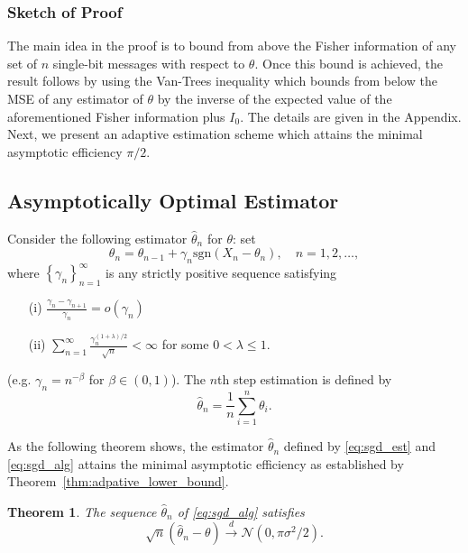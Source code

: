 \documentclass[letterpaper, conference]{IEEEtran}      %
\newtheorem{thm}{\bf{Theorem}}
\newcommand{\sgn}{\mathrm{sgn} }
\begin{document}
\subsubsection*{Sketch of Proof}
The main idea in the proof is to bound from above the Fisher information of any set of $n$ single-bit messages with respect to $\theta$. Once this bound is achieved, the result follows by using the Van-Trees inequality \cite{gill1995applications} which bounds from below the MSE of any estimator of $\theta$ by the inverse of the expected value of the aforementioned Fisher information plus $I_0$. The details are given in the Appendix.\\

Next, we present an adaptive estimation scheme which attains the minimal asymptotic efficiency $\pi/2$. 

\subsection{Asymptotically Optimal Estimator}
Consider the following estimator $\widehat{\theta}_n$ for $\theta$:  set 
\begin{equation}
\label{eq:sgd_alg}
\theta_n = \theta_{n-1} +  \gamma_n \sgn (X_n - \theta_n), \quad n = 1,2,\ldots,
\end{equation}
where $\left\{\gamma_n \right\}_{n=1}^\infty$ is any strictly positive sequence satisfying 
\begin{enumerate}
\item[(i)] $\frac{\gamma_n - \gamma_{n+1}}{\gamma_n} = o(\gamma_n)$ \\
\item[(ii)] $\sum_{n=1}^\infty \frac{\gamma_n^{(1+\lambda)/2}} {\sqrt{n}} < \infty$ 
for some $0< \lambda \leq 1$.
\end{enumerate}
(e.g. $\gamma_n = n^{-\beta}$ for $\beta \in (0,1)$). The $n$th step estimation is defined by 
\begin{equation} \label{eq:sgd_est}
\widehat{\theta}_n =  \frac{1}{n} \sum_{i=1}^n  \theta_i. 
\end{equation}

As the following theorem shows, the estimator $\widehat{\theta}_n$ defined by \eqref{eq:sgd_est} and \eqref{eq:sgd_alg} attains the minimal asymptotic efficiency as established by Theorem~\ref{thm:adpative_lower_bound}.
\begin{thm} \label{thm:sgd}
The sequence $\widehat{\theta}_n$ of \eqref{eq:sgd_alg} satisfies
\[
\sqrt{n} \left( \widehat{\theta}_n - \theta \right) \overset{d}{\rightarrow} \mathcal N \left(0,  \pi \sigma^2 /2 \right).
\]
\end{thm}
\end{document}
